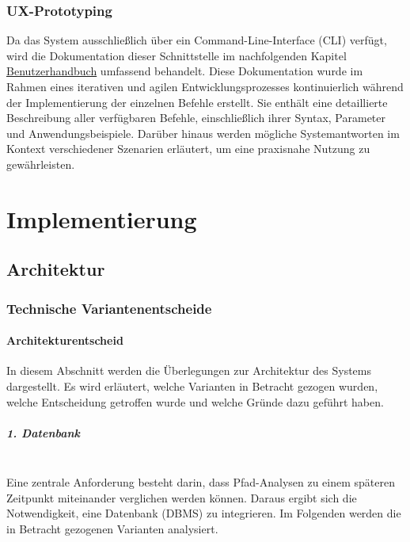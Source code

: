 \documentclass[a4paper,12pt]{report}
\begin{document}
    \newpage

    \subsection{UX-Prototyping}
    Da das System ausschließlich über ein Command-Line-Interface (CLI) verfügt,
    wird die Dokumentation dieser Schnittstelle im nachfolgenden Kapitel \hyperref[sec:user-manual]{Benutzerhandbuch}
    umfassend behandelt.
    Diese Dokumentation wurde im Rahmen eines iterativen und agilen Entwicklungsprozesses
    kontinuierlich während der Implementierung der einzelnen Befehle erstellt.
    Sie enthält eine detaillierte Beschreibung aller verfügbaren Befehle, einschließlich ihrer Syntax, Parameter und Anwendungsbeispiele.
    Darüber hinaus werden mögliche Systemantworten im Kontext verschiedener Szenarien erläutert,
    um eine praxisnahe Nutzung zu gewährleisten.


    \chapter{Implementierung}


    \section{Architektur}

    \subsection{Technische Variantenentscheide}\label{subsec:technische-variantenentscheide}

    \subsubsection{Architekturentscheid}
    In diesem Abschnitt werden die Überlegungen zur Architektur des Systems dargestellt.
    Es wird erläutert, welche Varianten in Betracht gezogen wurden, welche Entscheidung getroffen wurde und welche Gründe dazu geführt haben.

    \paragraph*{1. Datenbank}\mbox{}\\
    Eine zentrale Anforderung besteht darin, dass Pfad-Analysen zu einem späteren Zeitpunkt miteinander verglichen werden können.
    Daraus ergibt sich die Notwendigkeit, eine Datenbank (DBMS) zu integrieren.
    Im Folgenden werden die in Betracht gezogenen Varianten analysiert.
\end{document}
